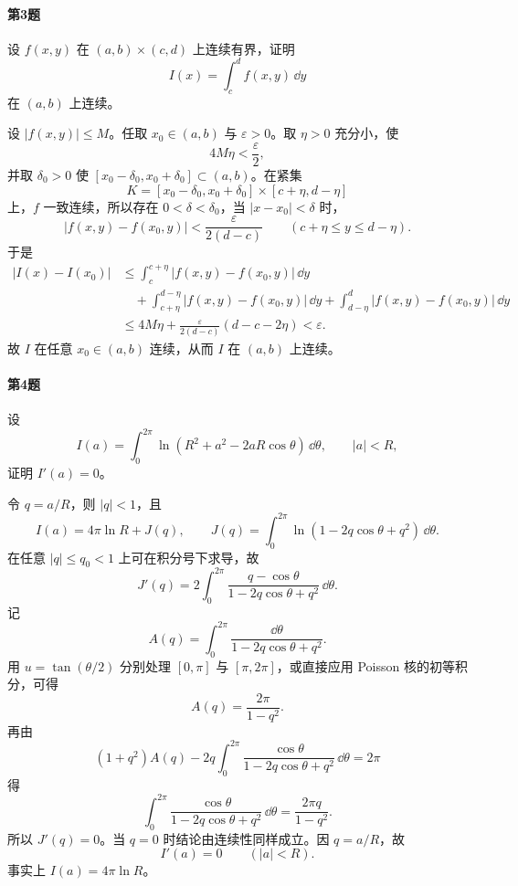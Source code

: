\paragraph{第3题}
设 $f(x,y)$ 在 $(a,b)\times(c,d)$ 上连续有界，证明
\[
I(x)=\int_c^d f(x,y)\,\dd y
\]
在 $(a,b)$ 上连续。

\begin{xsolution}
设 $|f(x,y)|\leqslant M$。任取 $x_0\in(a,b)$ 与 $\varepsilon>0$。取 $\eta>0$ 充分小，使
\[
4M\eta<\frac\varepsilon2,
\]
并取 $\delta_0>0$ 使 $[x_0-\delta_0,x_0+\delta_0]\subset(a,b)$。在紧集
\[
K=[x_0-\delta_0,x_0+\delta_0]\times[c+\eta,d-\eta]
\]
上，$f$ 一致连续，所以存在 $0<\delta<\delta_0$，当 $|x-x_0|<\delta$ 时，
\[
|f(x,y)-f(x_0,y)|<\frac{\varepsilon}{2(d-c)}
\qquad(c+\eta\leqslant y\leqslant d-\eta).
\]
于是
\[
\begin{aligned}
|I(x)-I(x_0)|
&\leqslant\int_c^{c+\eta}|f(x,y)-f(x_0,y)|\,\dd y\\
&\quad+\int_{c+\eta}^{d-\eta}|f(x,y)-f(x_0,y)|\,\dd y
+\int_{d-\eta}^{d}|f(x,y)-f(x_0,y)|\,\dd y\\
&\leqslant4M\eta+\frac{\varepsilon}{2(d-c)}(d-c-2\eta)<\varepsilon.
\end{aligned}
\]
故 $I$ 在任意 $x_0\in(a,b)$ 连续，从而 $I$ 在 $(a,b)$ 上连续。
\end{xsolution}

\paragraph{第4题}
设
\[
I(a)=\int_0^{2\pi}\ln(R^2+a^2-2aR\cos\theta)\,\dd\theta,
\qquad |a|<R,
\]
证明 $I'(a)=0$。

\begin{xsolution}
令 $q=a/R$，则 $|q|<1$，且
\[
I(a)=4\pi\ln R+J(q),
\qquad
J(q)=\int_0^{2\pi}\ln(1-2q\cos\theta+q^2)\,\dd\theta.
\]
在任意 $|q|\leqslant q_0<1$ 上可在积分号下求导，故
\[
J'(q)=2\int_0^{2\pi}\frac{q-\cos\theta}{1-2q\cos\theta+q^2}\,\dd\theta.
\]
记
\[
A(q)=\int_0^{2\pi}\frac{\dd\theta}{1-2q\cos\theta+q^2}.
\]
用 $u=\tan(\theta/2)$ 分别处理 $[0,\pi]$ 与 $[\pi,2\pi]$，或直接应用 Poisson 核的初等积分，可得
\[
A(q)=\frac{2\pi}{1-q^2}.
\]
再由
\[
(1+q^2)A(q)-2q\int_0^{2\pi}
\frac{\cos\theta}{1-2q\cos\theta+q^2}\,\dd\theta=2\pi
\]
得
\[
\int_0^{2\pi}\frac{\cos\theta}{1-2q\cos\theta+q^2}\,\dd\theta
=\frac{2\pi q}{1-q^2}.
\]
所以 $J'(q)=0$。当 $q=0$ 时结论由连续性同样成立。因 $q=a/R$，故
\[
\boxed{I'(a)=0\qquad(|a|<R)}.
\]
事实上 $I(a)=4\pi\ln R$。
\end{xsolution}

